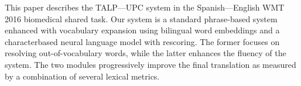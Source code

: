 This paper describes the TALP---UPC system in the Spanish---English WMT 2016 biomedical shared task. Our system is a standard phrase-based system enhanced with vocabulary expansion using bilingual word embeddings and a characterbased neural language model with rescoring. The former focuses on resolving out-of-vocabulary words, while the latter enhances the fluency of the system. The two modules progressively improve the final translation as measured by a combination of several lexical metrics.
